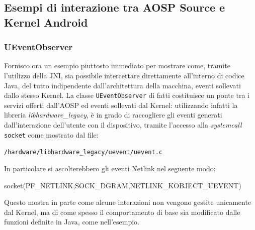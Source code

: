 \subsection{Esempi di interazione tra AOSP Source e Kernel Android}
\subsubsection{UEventObserver}
Fornisco ora un esempio piuttosto immediato per mostrare come, tramite l'utilizzo della JNI, sia possibile intercettare direttamente all'interno di codice Java, del tutto indipendente dall'architettura della macchina, eventi sollevati dallo stesso Kernel. La classe \texttt{\small UEventObserver} di fatti costituisce un ponte tra i servizi offerti dall'AOSP ed eventi sollevati dal Kernel: utilizzando infatti la libreria \textit{libhardware\_legacy}, è in grado di raccogliere gli eventi generati dall'interazione dell'utente con il dispositivo, tramite l'accesso alla \textit{systemcall} \texttt{\small socket} come mostrato dal file:
\begin{center}
\AOSP\texttt{\small/hardware/libhardware\_legacy/uevent/uevent.c}
\end{center}
In particolare si ascolterebbero gli eventi Netlink nel seguente modo:
\begin{clang}
socket(PF_NETLINK,SOCK_DGRAM,NETLINK_KOBJECT_UEVENT)
\end{clang}
Questo mostra in parte come alcune interazioni non vengono gestite unicamente dal Kernel, ma di come spesso il comportamento di base sia modificato dalle funzioni definite in Java, come nell'esempio.

